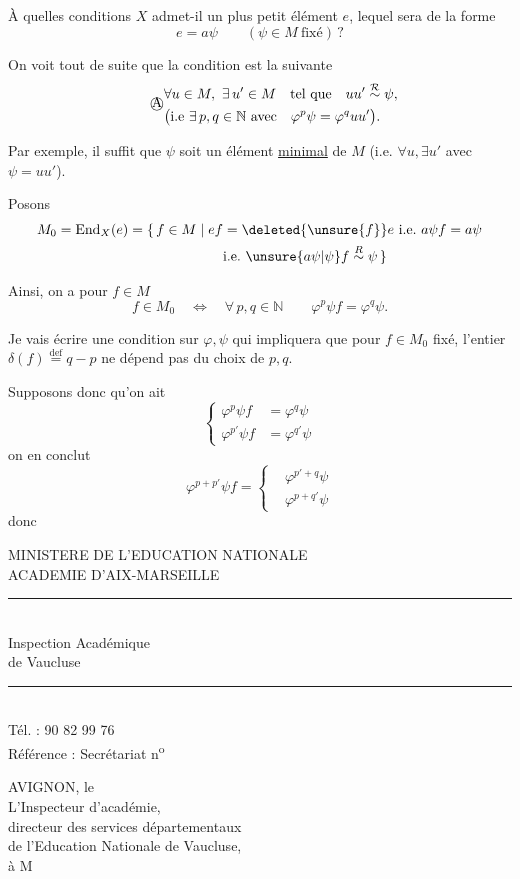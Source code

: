 À quelles conditions $X$ admet-il un plus petit élément $e$, lequel sera de la forme
\[
e=a\psi\qquad(\psi\in M\ \text{fixé})\,?
\]

On voit tout de suite que la condition est la suivante
\[
\tag*{\textcircled{A}}\begin{aligned}&\forall u\in M,\ \exists\,u'\in M\quad\text{tel que}\quad uu'\overset{\mathcal R}\sim\psi,\\ &\bigl(\text{i.e }\exists\,p,q\in\mathbb N\ \text{avec}\quad \varphi^p\psi=\varphi^q uu'\bigr).\end{aligned}
\]

Par exemple, il suffit que $\psi$ soit un élément \uline{minimal} de $M$ (i.e. $\forall u,\exists u'$ avec $\psi=uu'$).


Posons
\[
\begin{aligned}M_0=\mathrm{End}_X(e)=\{\,f\in M\mid ef&=\deleted{\unsure{f}}e\ \text{i.e.}\ a\psi f=a\psi\\ &\text{i.e.}\ \unsure{a\psi|\psi}f\overset{R}\sim\psi\,\}\end{aligned}
\]

Ainsi, on a pour $f\in M$
\[
f\in M_0\quad\Longleftrightarrow\quad\forall\,p,q\in\mathbb N\qquad\varphi^p\psi f=\varphi^q\psi.
\]

Je vais écrire une condition sur $\varphi,\psi$ qui impliquera que pour $f\in M_0$ fixé, l'entier $\delta(f)\overset{\mathrm{def}}{=}q-p$ ne dépend pas du choix de $p,q$.

Supposons donc qu'on ait
\[
\left\{\begin{aligned}\varphi^p\psi f&=\varphi^q\psi\\ \varphi^{p'}\psi f&=\varphi^{q'}\psi\end{aligned}\right.
\]
on en conclut
\[
\varphi^{p+p'}\psi f=\left\{\begin{aligned}&\varphi^{p'+q}\psi\\ &\varphi^{p+q'}\psi\end{aligned}\right.
\]
donc
\par\smallskip
{\footnotesize\noindent\begin{minipage}[t]{.46\linewidth}\raggedright
MINISTERE DE L'EDUCATION NATIONALE\\ ACADEMIE D'AIX-MARSEILLE\\ \rule{2.6em}{.3pt}\\ Inspection Académique\\ de Vaucluse\\ \rule{2.6em}{.3pt}\\ Tél. : 90 82 99 76\\ Référence : Secrétariat n\textsuperscript{o}
\end{minipage}\hfill%
\begin{minipage}[t]{.51\linewidth}\raggedright
AVIGNON, le\\ L'Inspecteur d'académie,\\ directeur des services départementaux\\ de l'Education Nationale de Vaucluse,\\ à M
\end{minipage}\par}

